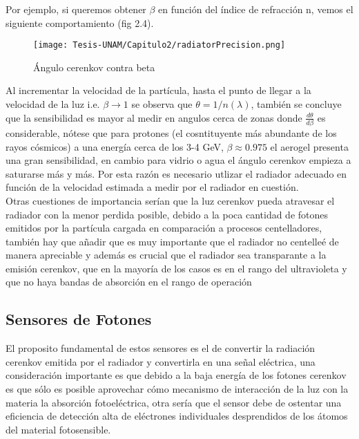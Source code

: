 Por ejemplo, si queremos obtener $\beta$ en función del índice de refracción n, vemos el siguiente comportamiento (fig 2.4).\\

\begin{figure}[h!]
    \centering
    \texttt{[image: Tesis-UNAM/Capitulo2/radiatorPrecision.png]}
    \caption{Ángulo cerenkov contra beta}
    \label{fig:enter-label}
\end{figure}

Al incrementar la velocidad de la partícula, hasta el punto de llegar a la velocidad de la luz i.e. $\beta \longrightarrow 1$ se observa que $\theta = 1/n(\lambda)$, también se concluye que la sensibilidad es mayor al medir en angulos cerca de zonas donde $\frac{d\theta}{d\beta}$ es considerable, nótese que para protones (el cosntituyente más abundante de los rayos cósmicos) a una energía cerca de los 3-4 GeV, $\beta \approx 0.975$
el aerogel presenta una gran sensibilidad, en cambio para vidrio o agua el ángulo cerenkov empieza a saturarse más y más. Por esta razón es necesario utlizar el radiador adecuado en función de la velocidad estimada a medir por el radiador en cuestión.\\

Otras cuestiones de importancia serían que la luz cerenkov pueda atravesar el radiador con la menor perdida posible, debido a la poca cantidad de fotones emitidos por la partícula cargada en comparación a procesos centelladores, también hay que añadir que es muy importante que el radiador no centelleé de manera apreciable y además es crucial que el radiador sea transparante a la emisión cerenkov, que en la mayoría de los casos es en el rango del ultravioleta y que no haya bandas de absorción en el rango de operación\cite{RICHCERN}

\subsection{Sensores de Fotones}
El proposito fundamental de estos sensores es el de convertir la radiación cerenkov emitida por el radiador y convertirla en una señal eléctrica\cite{RICHCERN}, una consideración importante es que debido a la baja energía de los fotones cerenkov es que sólo es posible aprovechar cómo mecanismo de interacción de la luz con la materia la absorción fotoeléctrica, otra sería que el sensor debe de ostentar una eficiencia de detección alta de eléctrones individuales desprendidos de los átomos del material fotosensible.\\


